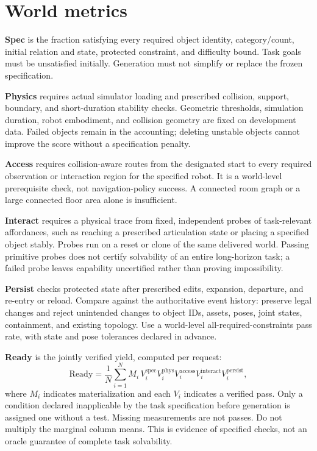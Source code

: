 \documentclass[10pt,a4paper]{article}
\begin{document}
\section{World metrics}
\textbf{Spec} is the fraction satisfying every required object identity, category/count, initial relation and state, protected constraint, and difficulty bound. Task goals must be unsatisfied initially. Generation must not simplify or replace the frozen specification.

\textbf{Physics} requires actual simulator loading and prescribed collision, support, boundary, and short-duration stability checks. Geometric thresholds, simulation duration, robot embodiment, and collision geometry are fixed on development data. Failed objects remain in the accounting; deleting unstable objects cannot improve the score without a specification penalty.

\textbf{Access} requires collision-aware routes from the designated start to every required observation or interaction region for the specified robot. It is a world-level prerequisite check, not navigation-policy success. A connected room graph or a large connected floor area alone is insufficient.

\textbf{Interact} requires a physical trace from fixed, independent probes of task-relevant affordances, such as reaching a prescribed articulation state or placing a specified object stably. Probes run on a reset or clone of the same delivered world. Passing primitive probes does not certify solvability of an entire long-horizon task; a failed probe leaves capability uncertified rather than proving impossibility.

\textbf{Persist} checks protected state after prescribed edits, expansion, departure, and re-entry or reload. Compare against the authoritative event history: preserve legal changes and reject unintended changes to object IDs, assets, poses, joint states, containment, and existing topology. Use a world-level all-required-constraints pass rate, with state and pose tolerances declared in advance.

\textbf{Ready} is the jointly verified yield, computed per request:
\begin{equation}
 \mathrm{Ready}=\frac{1}{N}\sum_{i=1}^{N}
 M_i\,V_i^{\mathrm{spec}}V_i^{\mathrm{phys}}V_i^{\mathrm{access}}
 V_i^{\mathrm{interact}}V_i^{\mathrm{persist}},
\end{equation}
where $M_i$ indicates materialization and each $V_i$ indicates a verified pass. Only a condition declared inapplicable by the task specification before generation is assigned one without a test. Missing measurements are not passes. Do not multiply the marginal column means. This is evidence of specified checks, not an oracle guarantee of complete task solvability.
\end{document}
